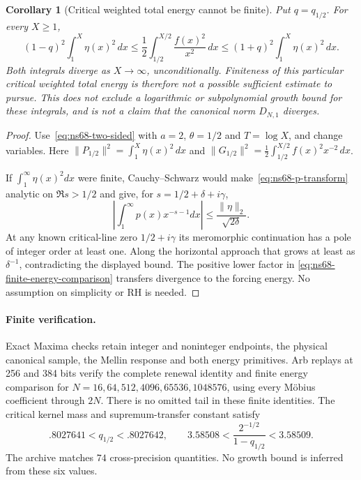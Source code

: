 \documentclass[11pt]{article}
\newtheorem{corollary}[theorem]{Corollary}
\theoremstyle{remark}
\begin{document}
\begin{corollary}[Critical weighted total energy cannot be finite]
\label{cor:ns68-critical-energy}
Put $q=q_{1/2}$. For every $X\geq1$,
\begin{equation}
 (1-q)^2\int_1^X\eta(x)^2\,dx
 \leq\frac12\int_{1/2}^{X/2}\frac{f(x)^2}{x^2}\,dx
 \leq(1+q)^2\int_1^X\eta(x)^2\,dx.
 \label{eq:ns68-finite-energy-comparison}
\end{equation}
Both integrals diverge as $X\to\infty$, unconditionally. Finiteness
of this particular critical weighted total energy is therefore not a
possible sufficient estimate to pursue. This does not exclude a
logarithmic or subpolynomial growth bound for these integrals, and is
not a claim that the canonical norm $D_{N,1}$ diverges.
\end{corollary}
\begin{proof}
Use~\eqref{eq:ns68-two-sided} with $a=2$, $\theta=1/2$ and
$T=\log X$, and change variables. Here
$\|P_{1/2}\|^2=\int_1^X\eta(x)^2\,dx$ and
$\|G_{1/2}\|^2=\tfrac12\int_{1/2}^{X/2}f(x)^2x^{-2}\,dx$.

If $\int_1^\infty\eta(x)^2dx$ were finite, Cauchy--Schwarz would
make~\eqref{eq:ns68-p-transform} analytic on $\Re s>1/2$ and give,
for $s=1/2+\delta+i\gamma$,
\[
 \left|\int_1^\infty p(x)x^{-s-1}dx\right|
       \leq\frac{\|\eta\|_2}{\sqrt{2\delta}}.
\]
At any known critical-line zero $1/2+i\gamma$ its meromorphic
continuation has a pole of integer order at least one. Along the
horizontal approach that grows at least as $\delta^{-1}$, contradicting
the displayed bound. The positive lower factor in
\eqref{eq:ns68-finite-energy-comparison} transfers divergence to the
forcing energy. No assumption on simplicity or RH is needed.
\end{proof}

\paragraph{Finite verification.}
Exact Maxima checks retain integer and noninteger endpoints, the physical
canonical sample, the Mellin response and both energy primitives.
Arb replays at 256 and 384 bits verify the complete renewal identity
and finite energy comparison for
$N=16,64,512,4096,65536,1048576$, using every M\"obius coefficient
through $2N$. There is no omitted tail in these finite identities.
The critical kernel mass and supremum-transfer constant satisfy
\[
 .8027641<q_{1/2}<.8027642,\qquad
 3.58508<\frac{2^{-1/2}}{1-q_{1/2}}<3.58509.
\]
The archive matches $74$ cross-precision quantities. No growth bound
is inferred from these six values.
\end{document}
